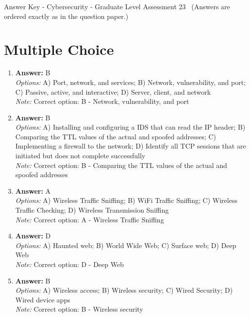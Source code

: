 \documentclass[12pt]{article}
\begin{document}
\begin{center}
Answer Key - Cybersecurity - Graduate Level Assessment 23 \
\small (Answers are ordered exactly as in the question paper.)
\end{center}

\section*{Multiple Choice}
\begin{enumerate}[label=\arabic*.]
\item \textbf{Answer:} B
\\ \textit{Options:} A) Port, network, and services; B) Network, vulnerability, and port; C) Passive, active, and interactive; D) Server, client, and network
\\ \textit{Note:} Correct option: B - Network, vulnerability, and port
\item \textbf{Answer:} B
\\ \textit{Options:} A) Installing and configuring a IDS that can read the IP header; B) Comparing the TTL values of the actual and spoofed addresses; C) Implementing a firewall to the network; D) Identify all TCP sessions that are initiated but does not complete successfully
\\ \textit{Note:} Correct option: B - Comparing the TTL values of the actual and spoofed addresses
\item \textbf{Answer:} A
\\ \textit{Options:} A) Wireless Traffic Sniffing; B) WiFi Traffic Sniffing; C) Wireless Traffic Checking; D) Wireless Transmission Sniffing
\\ \textit{Note:} Correct option: A - Wireless Traffic Sniffing
\item \textbf{Answer:} D
\\ \textit{Options:} A) Haunted web; B) World Wide Web; C) Surface web; D) Deep Web
\\ \textit{Note:} Correct option: D - Deep Web
\item \textbf{Answer:} B
\\ \textit{Options:} A) Wireless access; B) Wireless security; C) Wired Security; D) Wired device apps
\\ \textit{Note:} Correct option: B - Wireless security
\end{enumerate}
\end{document}
